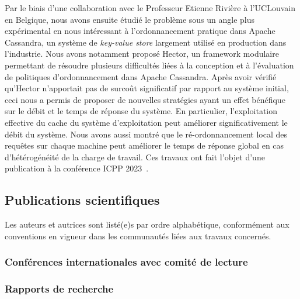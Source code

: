 \documentclass[12pt]{article}
\begin{document}
Par le biais d'une collaboration avec le Professeur Etienne Rivière à l'UCLouvain en Belgique, nous
avons ensuite étudié le problème sous un angle plus expérimental en nous intéressant à
l'ordonnancement pratique dans Apache Cassandra, un système de \emph{key-value store} largement
utilisé en production dans l'industrie.  
Nous avons notamment proposé Hector, un framework modulaire permettant de résoudre plusieurs
difficultés liées à la conception et à l'évaluation de politiques d'ordonnancement dans Apache
Cassandra.  
Après avoir vérifié qu'Hector n'apportait pas de surcoût significatif par rapport au système
initial, ceci nous a permis de proposer de nouvelles stratégies ayant un effet bénéfique sur le
débit et le temps de réponse du système.  
En particulier, l'exploitation effective du cache du système d'exploitation peut améliorer
significativement le débit du système.  
Nous avons aussi montré que le ré-ordonnancement local des requêtes sur chaque machine peut
améliorer le temps de réponse global en cas d'hétérogénéité de la charge de travail.  
Ces travaux ont fait l'objet d'une publication à la conférence ICPP 2023~\cite{canon2023b}.

\subsection{Publications scientifiques}

Les auteurs et autrices sont listé(e)s par ordre alphabétique, conformément aux conventions en
vigueur dans les communautés liées aux travaux concernés.

\newcommand{\showbib}[1]{%
    \begin{otherlanguage}{english}
        \printbibliography[heading=none,keyword={#1}]
    \end{otherlanguage}}

\subsubsection*{Conférences internationales avec comité de lecture}

\showbib{international proceedings}

\subsubsection*{Rapports de recherche}

\showbib{research report}

\end{document}

